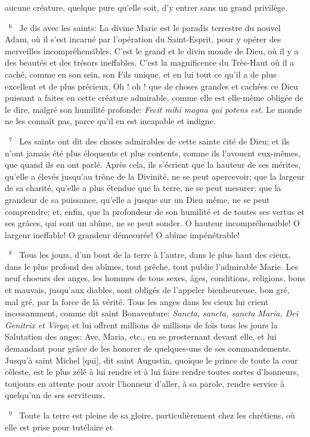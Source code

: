 \documentclass[paper=a5,pagesize=pdftex,fontsize=15pt,headinclude=on,twoside=off]{scrbook}
\newcommand{\negphantom}[1]{\settowidth{\dimen0}{#1}\hspace*{-\dimen0}}
\newcommand{\versenb}[1]{\par \vspace{10pt}~\negphantom{~${}^{#1}$~}${}^{#1}$~}
\newcommand{\latin}[1]{\emph{#1}}
\begin{document}
aucune créature, quelque pure qu'elle soit, d'y entrer sans un grand privilège.
\versenb{6} Je dis avec les saints: La divine Marie est le paradis terrestre du nouvel Adam, où il s'est incarné par l'opération
du Saint-Esprit, pour y opérer des merveilles incompréhensibles. C'est le grand et le divin monde de Dieu, où il y a
des beautés et des trésors ineffables. C'est la magnificence du Très-Haut où il a caché, comme en son sein, son
Fils unique, et en lui tout ce qu'il a de plus excellent et de plus précieux. Oh ! oh ! que de choses grandes et
cachées ce Dieu puissant a faites en cette créature admirable, comme elle est elle-même obligée de le dire,
malgré son humilité profonde: \latin{Fecit mihi magna qui potens est.} Le monde ne les connaît pas, parce qu'il en est
incapable et indigne.
\versenb{7} Les saints ont dit des choses admirables de cette sainte cité de Dieu; et ils n'ont jamais été plus éloquents et
plus contents, comme ils l'avouent eux-mêmes, que quand ils en ont parlé. Après cela, ils s'écrient que la hauteur
de ses mérites, qu'elle a élevés jusqu'au trône de la Divinité, ne se peut apercevoir; que la largeur de sa charité,
qu'elle a plus étendue que la terre, ne se peut mesurer; que la grandeur de sa puissance, qu'elle a jusque sur un
Dieu même, ne se peut comprendre; et, enfin, que la profondeur de son humilité et de toutes ses vertus et ses
grâces, qui sont un abîme, ne se peut sonder. O hauteur incompréhensible! O largeur ineffable! O grandeur
démesurée! O abîme impénétrable!
\versenb{8} Tous les jours, d'un bout de la terre à l'autre, dans le plus haut des cieux, dans le plus profond des abîmes, tout
prêche, tout publie l'admirable Marie. Les neuf choeurs des anges, les hommes de tous sexes, âges, conditions,
religions, bons et mauvais, jusqu'aux diables, sont obligés de l'appeler bienheureuse, bon gré, mal gré, par la force
de là vérité. Tous les anges dans les cieux lui crient incessamment, comme dit saint Bonaventure: \latin{Sancta, sancta,
sancta Maria, Dei Genitrix et Virgo}; et lui offrent millions de millions de fois tous les jours la Salutation des anges:
Ave, Maria, etc., en se prosternant devant elle, et lui demandant pour grâce de les honorer de quelques-uns de
ses commandements. Jusqu'à saint Michel [qui], dit saint Augustin, quoique le prince de toute la cour céleste, est
le plus zélé à lui rendre et à lui faire rendre toutes sortes d'honneurs, toujours en attente pour avoir l'honneur
d'aller, à sa parole, rendre service à quelqu'un de ses serviteurs.
\versenb{9} Toute la terre est pleine de sa gloire, particulièrement chez les chrétiens, où elle est prise pour tutélaire et
\end{document}
